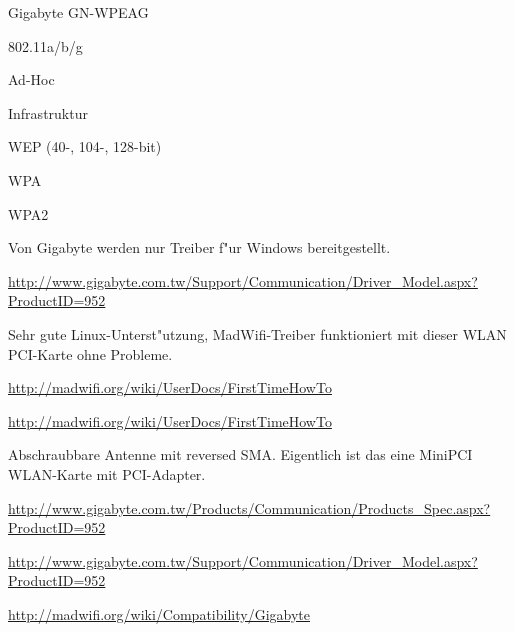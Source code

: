 %
%
\begin{wlandevice}{Gigabyte GN-WPEAG}



\begin{wlanieeestandard}
\item 802.11a/b/g
\end{wlanieeestandard}

\begin{wlanmode}
\item Ad-Hoc
\item Infrastruktur
\end{wlanmode}

\begin{wlansecurity}
\item WEP (40-, 104-, 128-bit)
\item WPA
\item WPA2
\end{wlansecurity}

\begin{wlandriver}
\item
Von Gigabyte werden nur Treiber f"ur Windows bereitgestellt.

\url{http://www.gigabyte.com.tw/Support/Communication/Driver_Model.aspx?ProductID=952}

Sehr gute Linux-Unterst"utzung, MadWifi-Treiber funktioniert
mit dieser WLAN PCI-Karte ohne Probleme.

\url{http://madwifi.org/wiki/UserDocs/FirstTimeHowTo}
\end{wlandriver}


\begin{wlaninstall}
\item \url{http://madwifi.org/wiki/UserDocs/FirstTimeHowTo}
\end{wlaninstall}

\begin{wlanextrainfo}
\item
Abschraubbare Antenne mit reversed SMA.
Eigentlich ist das eine MiniPCI WLAN-Karte mit PCI-Adapter.
\end{wlanextrainfo}

\begin{wlanlink}
\item \url{http://www.gigabyte.com.tw/Products/Communication/Products_Spec.aspx?ProductID=952}
\item \url{http://www.gigabyte.com.tw/Support/Communication/Driver_Model.aspx?ProductID=952}
\item \url{http://madwifi.org/wiki/Compatibility/Gigabyte}
\end{wlanlink}

\end{wlandevice}

